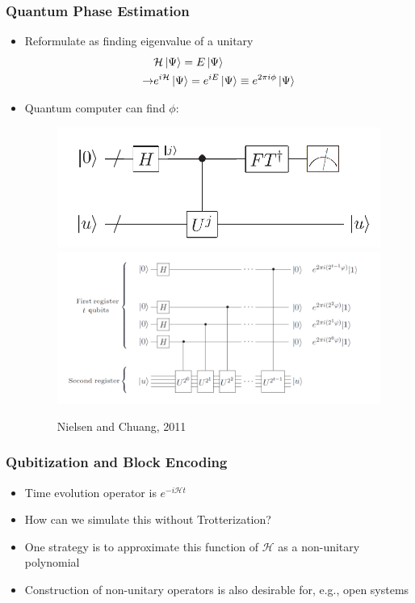 \documentclass[aspectratio=169]{beamer}
\begin{document}
\begin{frame}
	\frametitle{Quantum Phase Estimation}
	\begin{itemize}[<+->]
		\item Reformulate as finding eigenvalue of a unitary
			\begin{align}\nonumber
				&\mathcal{H}\ket{\Psi}=E\ket{\Psi}\\\rightarrow &e^{i\mathcal{H}}\ket{\Psi} = e^{iE}\ket{\Psi}\equiv e^{2\pi i\phi}\ket{\Psi}\nonumber
			\end{align}
		\item Quantum computer can find $\phi$:
			\begin{figure}
				\includegraphics[width=.45\textwidth]{pea_overall.png}%
				\includegraphics[width=.45\textwidth]{pea_1.png}%
			\caption{Nielsen and Chuang, 2011}
			\end{figure}
        \end{itemize}
\end{frame}



\begin{frame}
	\frametitle{Qubitization and Block Encoding }
	\begin{itemize}[<+->]
	\item Time evolution operator is $e^{-i\mathcal{H}t}$
	\item How can we simulate this without Trotterization?
	\item One strategy is to approximate this function of $\mathcal{H}$ as a non-unitary polynomial
	\item Construction of non-unitary operators is also desirable for, e.g., open systems	
	\end{itemize}

\end{frame}
\end{document}
